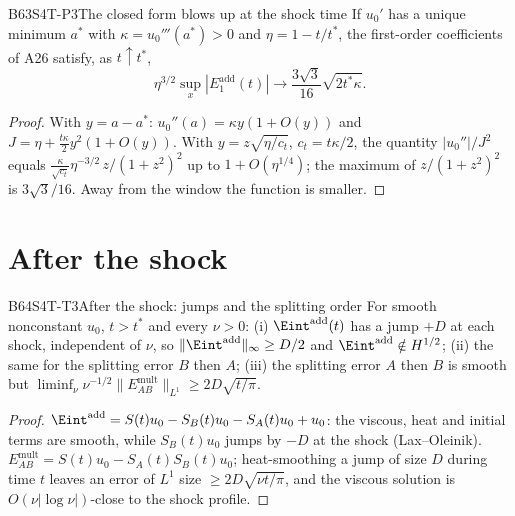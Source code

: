 \begin{dimcard}{B63}{S4T-P3}{The closed form blows up at the shock time}{\pw}{}
If $u_0'$ has a unique minimum $a^*$ with $\kappa=u_0'''(a^*)>0$ and $\eta=1-t/t^*$, the first-order coefficients of A26 satisfy, as $t\uparrow t^*$,
\[
\eta^{3/2}\sup_x|E_1^{\mathrm{add}}(t)|\to\frac{3\sqrt3}{16}\sqrt{2t^*\kappa}.
\]
\end{dimcard}
\begin{proof}
With $y=a-a^*$: $u_0''(a)=\kappa y(1+O(y))$ and $J=\eta+\tfrac{t\kappa}{2}y^2(1+O(y))$.
With $y=z\sqrt{\eta/c_t}$, $c_t=t\kappa/2$, the quantity $|u_0''|/J^2$ equals $\frac{\kappa}{\sqrt{c_t}}\eta^{-3/2}\,z/(1+z^2)^2$ up to $1+O(\eta^{1/4})$; the maximum of $z/(1+z^2)^2$ is $3\sqrt3/16$. Away from the window the function is smaller.
\end{proof}

\section{After the shock}

\begin{dimcard}{B64}{S4T-T3}{After the shock: jumps and the splitting order}{\modulo{[F1]}}{}
For smooth nonconstant $u_0$, $t>t^*$ and every $\nu>0$: (i) $\Eint^{\mathrm{add}}(t)$ has a jump $+D$ at each shock, independent of $\nu$, so $\|\Eint^{\mathrm{add}}\|_\infty\ge D/2$ and $\Eint^{\mathrm{add}}\notin H^{1/2}$; (ii) the same for the splitting error $B$ then $A$; (iii) the splitting error $A$ then $B$ is smooth but $\liminf_\nu\nu^{-1/2}\|E^{\mathrm{mult}}_{AB}\|_{L^1}\ge2D\sqrt{t/\pi}$.
\end{dimcard}
\begin{proof}
$\Eint^{\mathrm{add}}=S(t)u_0-S_B(t)u_0-S_A(t)u_0+u_0$: the viscous, heat and initial terms are smooth, while $S_B(t)u_0$ jumps by $-D$ at the shock (Lax--Oleinik).
$E^{\mathrm{mult}}_{AB}=S(t)u_0-S_A(t)S_B(t)u_0$; heat-smoothing a jump of size $D$ during time $t$ leaves an error of $L^1$ size $\ge2D\sqrt{\nu t/\pi}$, and the viscous solution is $O(\nu|\log\nu|)$-close to the shock profile.
\end{proof}

